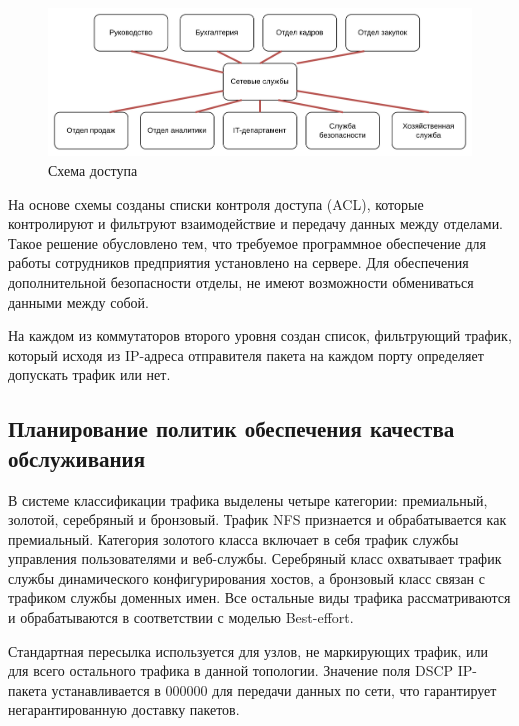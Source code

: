 \begin{figure}[H] 
\centering
\includegraphics[scale=0.16]{../misc/fieltre.png}
\caption{Схема доступа\label{fig:filtre}}
\end{figure}


На основе схемы созданы списки контроля доступа (ACL), которые контролируют и фильтруют взаимодействие и передачу данных между отделами. Такое решение обусловлено тем, что требуемое программное обеспечение для работы сотрудников предприятия установлено на сервере. Для обеспечения дополнительной безопасности отделы, не имеют возможности обмениваться данными между собой. 

На каждом из коммутаторов второго уровня создан список, фильтрующий трафик, который исходя из IP-адреса отправителя пакета на каждом порту определяет допускать трафик или нет. 


\subsection{Планирование политик обеспечения качества обслуживания}
В системе классификации трафика выделены четыре категории: премиальный, золотой, серебряный и бронзовый. Трафик NFS признается и обрабатывается как премиальный. Категория золотого класса включает в себя трафик службы управления пользователями и веб-службы. Серебряный класс охватывает трафик службы динамического конфигурирования хостов, а бронзовый класс связан с трафиком службы доменных имен. Все остальные виды трафика рассматриваются и обрабатываются в соответствии с моделью Best-effort.

Стандартная пересылка используется для узлов, не маркирующих трафик, или для всего остального трафика в данной топологии. Значение поля DSCP IP-пакета устанавливается в 000000 для передачи данных по сети, что гарантирует негарантированную доставку пакетов.

